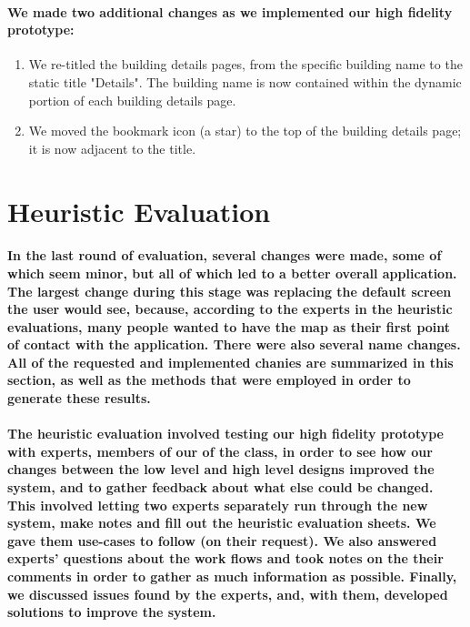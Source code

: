 \documentclass{report}
\begin{document}
    \paragraph{We made two additional changes as we implemented our high
    fidelity prototype:}
    \begin{enumerate}
    \item We re-titled the building details pages, from the specific building name to the
    static title "Details". The building name is now contained within the dynamic
    portion of each building details page.
    \item We moved the bookmark icon (a star) to the top of the building details page; it
    is now adjacent to the title.
    \end{enumerate}
\section{Heuristic Evaluation}
    \paragraph{In the last round of evaluation, several changes were made, some
    of which seem minor, but all of which led to a better overall application. The
    largest change during this stage was replacing the default screen the user would
    see, because, according to the experts in the heuristic evaluations, many people
    wanted to have the map as their first point of contact with the application.
    There were also several name changes. All of the requested and implemented
    chanies are summarized in this section, as well as the methods that were
    employed in order to generate these results.}
    \paragraph{The heuristic evaluation involved testing our high fidelity
    prototype with experts, members of our of the class, in order to see how our
    changes between the low level and high level designs improved the system, and to
    gather feedback about what else could be changed. This involved letting two
    experts separately run through the new system, make notes and fill out the
    heuristic evaluation sheets. We gave them use-cases to follow (on their
    request). We also answered experts' questions about the work flows and took
    notes on the their comments in order to gather as much information as possible.
    Finally, we discussed issues found by the experts, and, with them, developed
    solutions to improve the system.}
\end{document}
